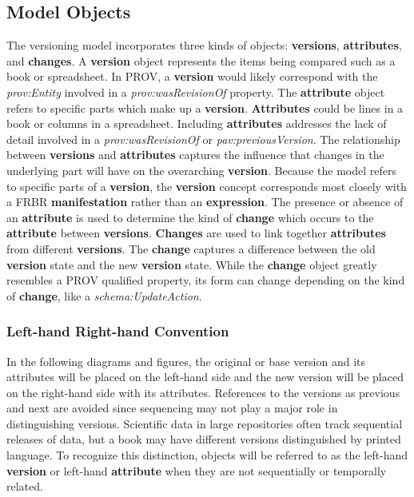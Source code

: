 \subsection{Model Objects}

The versioning model incorporates three kinds of objects: \textbf{versions}, \textbf{attribut\-es}, and \textbf{changes}.
A \textbf{version} object represents the items being compared such as a book or spreadsheet.
In PROV, a \textbf{version} would likely correspond with the \textit{prov:Entity} involved in a \textit{prov:wasRevisionOf} property.
The \textbf{attribute} object refers to specific parts which make up a \textbf{version}.
\textbf{Attributes} could be lines in a book or columns in a spreadsheet.
Including \textbf{attributes} addresses the lack of detail involved in a \textit{prov:wasRevisionOf} or \textit{pav:previousVersion}.
The relationship between \textbf{versions} and \textbf{attributes} captures the influence that changes in the underlying part will have on the overarching \textbf{version}.
Because the model refers to specific parts of a \textbf{version}, the \textbf{version} concept corresponds most closely with a FRBR \textbf{manifestation} rather than an \textbf{expression}.
The presence or absence of an \textbf{attribute} is used to determine the kind of \textbf{change} which occurs to the \textbf{attribute} between \textbf{versions}.
\textbf{Changes} are used to link together \textbf{attributes} from different \textbf{versions}.
The \textbf{change} captures a difference between the old \textbf{version} state and the new \textbf{version} state.
While the \textbf{change} object greatly resembles a PROV qualified property, its form can change depending on the kind of \textbf{change}, like a \textit{schema:UpdateAction}.

\subsubsection{Left-hand Right-hand Convention}

In the following diagrams and figures, the original or base version and its attributes will be placed on the left-hand side and the new version will be placed on the right-hand side with its attributes.
References to the versions as previous and next are avoided since sequencing may not play a major role in distinguishing versions.
Scientific data in large repositories often track sequential releases of data, but a book may have different versions distinguished by printed language.
To recognize this distinction, objects will be referred to as the left-hand \textbf{version} or left-hand \textbf{attribute} when they are not sequentially or temporally related.

